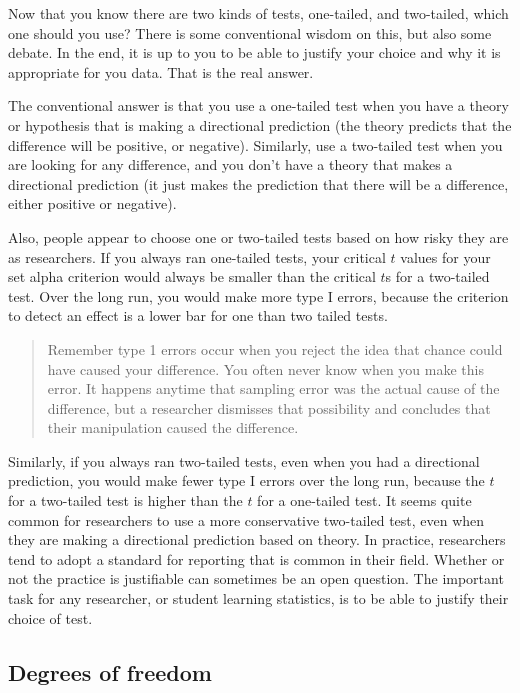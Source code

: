 \documentclass[
]{book}
\begin{document}
Now that you know there are two kinds of tests, one-tailed, and two-tailed, which one should you use? There is some conventional wisdom on this, but also some debate. In the end, it is up to you to be able to justify your choice and why it is appropriate for you data. That is the real answer.

The conventional answer is that you use a one-tailed test when you have a theory or hypothesis that is making a directional prediction (the theory predicts that the difference will be positive, or negative). Similarly, use a two-tailed test when you are looking for any difference, and you don't have a theory that makes a directional prediction (it just makes the prediction that there will be a difference, either positive or negative).

Also, people appear to choose one or two-tailed tests based on how risky they are as researchers. If you always ran one-tailed tests, your critical \(t\) values for your set alpha criterion would always be smaller than the critical \(t\)s for a two-tailed test. Over the long run, you would make more type I errors, because the criterion to detect an effect is a lower bar for one than two tailed tests.

\begin{quote}
Remember type 1 errors occur when you reject the idea that chance could have caused your difference. You often never know when you make this error. It happens anytime that sampling error was the actual cause of the difference, but a researcher dismisses that possibility and concludes that their manipulation caused the difference.
\end{quote}

Similarly, if you always ran two-tailed tests, even when you had a directional prediction, you would make fewer type I errors over the long run, because the \(t\) for a two-tailed test is higher than the \(t\) for a one-tailed test. It seems quite common for researchers to use a more conservative two-tailed test, even when they are making a directional prediction based on theory. In practice, researchers tend to adopt a standard for reporting that is common in their field. Whether or not the practice is justifiable can sometimes be an open question. The important task for any researcher, or student learning statistics, is to be able to justify their choice of test.

\hypertarget{degrees-of-freedom}{%
\subsection{Degrees of freedom}\label{degrees-of-freedom}}
\end{document}
